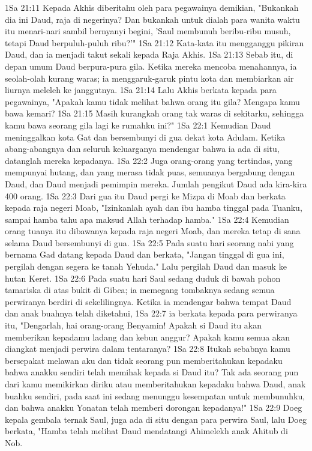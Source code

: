 1Sa 21:11  Kepada Akhis diberitahu oleh para pegawainya demikian, "Bukankah dia ini Daud, raja di negerinya? Dan bukankah untuk dialah para wanita waktu itu menari-nari sambil bernyanyi begini, 'Saul membunuh beribu-ribu musuh, tetapi Daud berpuluh-puluh ribu?'"
1Sa 21:12  Kata-kata itu mengganggu pikiran Daud, dan ia menjadi takut sekali kepada Raja Akhis.
1Sa 21:13  Sebab itu, di depan umum Daud berpura-pura gila. Ketika mereka mencoba menahannya, ia seolah-olah kurang waras; ia menggaruk-garuk pintu kota dan membiarkan air liurnya meleleh ke janggutnya.
1Sa 21:14  Lalu Akhis berkata kepada para pegawainya, "Apakah kamu tidak melihat bahwa orang itu gila? Mengapa kamu bawa kemari?
1Sa 21:15  Masih kurangkah orang tak waras di sekitarku, sehingga kamu bawa seorang gila lagi ke rumahku ini?"
1Sa 22:1  Kemudian Daud meninggalkan kota Gat dan bersembunyi di gua dekat kota Adulam. Ketika abang-abangnya dan seluruh keluarganya mendengar bahwa ia ada di situ, datanglah mereka kepadanya.
1Sa 22:2  Juga orang-orang yang tertindas, yang mempunyai hutang, dan yang merasa tidak puas, semuanya bergabung dengan Daud, dan Daud menjadi pemimpin mereka. Jumlah pengikut Daud ada kira-kira 400 orang.
1Sa 22:3  Dari gua itu Daud pergi ke Mizpa di Moab dan berkata kepada raja negeri Moab, "Izinkanlah ayah dan ibu hamba tinggal pada Tuanku, sampai hamba tahu apa maksud Allah terhadap hamba."
1Sa 22:4  Kemudian orang tuanya itu dibawanya kepada raja negeri Moab, dan mereka tetap di sana selama Daud bersembunyi di gua.
1Sa 22:5  Pada suatu hari seorang nabi yang bernama Gad datang kepada Daud dan berkata, "Jangan tinggal di gua ini, pergilah dengan segera ke tanah Yehuda." Lalu pergilah Daud dan masuk ke hutan Keret.
1Sa 22:6  Pada suatu hari Saul sedang duduk di bawah pohon tamariska di atas bukit di Gibea; ia memegang tombaknya sedang semua perwiranya berdiri di sekelilingnya. Ketika ia mendengar bahwa tempat Daud dan anak buahnya telah diketahui,
1Sa 22:7  ia berkata kepada para perwiranya itu, "Dengarlah, hai orang-orang Benyamin! Apakah si Daud itu akan memberikan kepadamu ladang dan kebun anggur? Apakah kamu semua akan diangkat menjadi perwira dalam tentaranya?
1Sa 22:8  Itukah sebabnya kamu bersepakat melawan aku dan tidak seorang pun memberitahukan kepadaku bahwa anakku sendiri telah memihak kepada si Daud itu? Tak ada seorang pun dari kamu memikirkan diriku atau memberitahukan kepadaku bahwa Daud, anak buahku sendiri, pada saat ini sedang menunggu kesempatan untuk membunuhku, dan bahwa anakku Yonatan telah memberi dorongan kepadanya!"
1Sa 22:9  Doeg kepala gembala ternak Saul, juga ada di situ dengan para perwira Saul, lalu Doeg berkata, "Hamba telah melihat Daud mendatangi Ahimelekh anak Ahitub di Nob.
